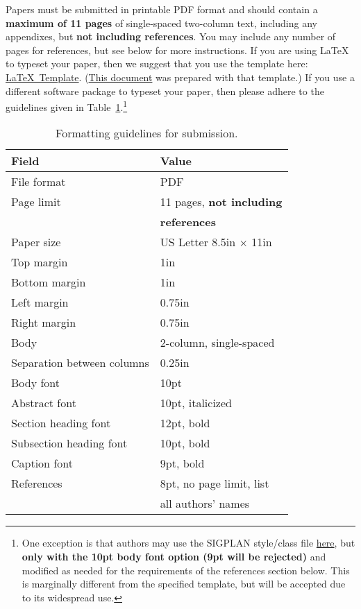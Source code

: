 \documentclass[pageno]{jpaper}
\begin{document}
Papers must be submitted in printable PDF format and should contain a
{\bf maximum of 11 pages} of single-spaced two-column text, including any
appendixes, but {\bf not
  including references}.  You may include any number of pages for
references, but see below for more instructions.  If you are using
\LaTeX~\cite{lamport94} to typeset your paper, then we suggest that
you use the template here:
\href{https://www.asplos2018.org/wp-content/uploads/2017/07/asplos18-latex-template.tar.gz}{\LaTeX~Template}.
(\href{https://www.asplos2018.org/wp-content/uploads/2017/07/asplos18-template.pdf}{This
  document} was prepared with that template.)  If you use a different
software package to typeset your paper, then please adhere to the
guidelines given in Table~\ref{table:formatting}.\footnote{One
  exception is that authors may use the SIGPLAN style/class file
  \href{http://classic.sigplan.org/sigplanconf.cls}{here}, but {\bf
    only with the 10pt body font option (9pt will be rejected)} and
  modified as needed for the requirements of the references section
  below.  This is marginally different from the specified template,
  but will be accepted due to its widespread use.}

\begin{table}[h!]
  \centering
  \begin{tabular}{|l|l|}
    \hline
    \textbf{Field} & \textbf{Value}\\
    \hline
    \hline
    File format & PDF \\
    \hline
    Page limit & 11 pages, {\bf not including}\\
               & {\bf references}\\
    \hline
    Paper size & US Letter 8.5in $\times$ 11in\\
    \hline
    Top margin & 1in\\
    \hline
    Bottom margin & 1in\\
    \hline
    Left margin & 0.75in\\
    \hline
    Right margin & 0.75in\\
    \hline
    Body & 2-column, single-spaced\\
    \hline
    Separation between columns & 0.25in\\
    \hline
    Body font & 10pt\\
    \hline
    Abstract font & 10pt, italicized\\
    \hline
    Section heading font & 12pt, bold\\
    \hline
    Subsection heading font & 10pt, bold\\
    \hline
    Caption font & 9pt, bold\\
    \hline
    References & 8pt, no page limit, list \\
               & all authors' names\\
    \hline
  \end{tabular}
  \caption{Formatting guidelines for submission. }
  \label{table:formatting}
\end{table}
\end{document}
